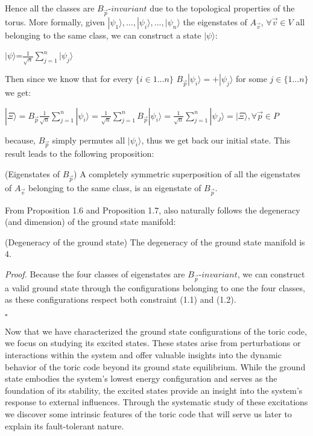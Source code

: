 \documentclass{Configuration_Files/PoliMi3i_thesis}
\begin{document}
Hence all the classes are $B_{\vec{p}} $-$invariant$ due to the topological properties of the torus. More formally, given $|\psi_1\rangle,...,|\psi_i\rangle,...,|\psi_n\rangle$ the eigenstates of $A_{\vec{v}}$, $\forall \vec{v} \in V$ all belonging to the same class, we can construct a state $|\psi\rangle$:

\begin{center}
	$|\psi\rangle$=$\frac{1}{\sqrt{n}}\sum_{j=1}^{n} |\psi_j\rangle$
\end{center} 

Then since we know that for every $\{ i \in 1 ... n \}$ $B_{\vec{p}} |\psi_i\rangle=+|\psi_j\rangle$ for some $j \in \{ 1 ... n\}$ we get:

\begin{center}
	$|\Xi\rangle= B_{\vec{p}}  \frac{1}{\sqrt{n}} \sum_{j=1}^{n} |\psi_i\rangle = \frac{1}{\sqrt{n}} \sum_{j=1}^{n} B_{\vec{p}} |\psi_i\rangle = \frac{1}{\sqrt{n}} \sum_{j=1}^{n} |\psi_J\rangle =|\Xi\rangle , \forall \vec{p} \in P$
\end{center}

because, $B_{\vec{p}} $ simply permutes all $|\psi_i\rangle$, thus we get back our initial state. This result leads to the following proposition:

\begin{proposition}(Eigenstates of $B_{\vec{p}} $) A completely symmetric superposition of all the eigenstates of $A_{\vec{v}}$ belonging to the same class, is an eigenstate of $B_{\vec{p}} $.
\end{proposition}

From Proposition 1.6 and Proposition 1.7, also naturally follows the degeneracy (and dimension) of the ground state manifold: \newline

\begin{proposition} (Degeneracy of the ground state) The degeneracy of the ground state manifold is $4$. 
\end{proposition}

\textit{Proof.}\newline
Because the four classes of eigenstates are $B_{\vec{p}} $-$invariant$, we can construct a valid ground state through the configurations belonging to one the four classes, as these configurations respect both constraint (1.1) and (1.2). 

\hfill $\square$
 
Now that we have characterized the ground state configurations of the toric code, we focus on studying its excited states. These states arise from perturbations or interactions within the system and offer valuable insights into the dynamic behavior of the toric code beyond its ground state equilibrium. While the ground state embodies the system's lowest energy configuration and serves as the foundation of its stability, the excited states provide an insight into the system's response to external influences. 
Through the systematic study of these excitations we discover some intrinsic features of the toric code that will serve us later to explain its fault-tolerant nature.
\end{document}
